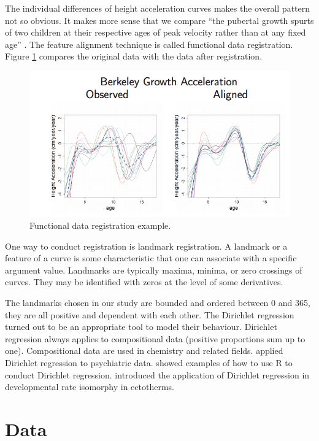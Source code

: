 \documentclass{article}
\begin{document}
The individual differences of height acceleration curves makes the overall pattern not so obvious. It makes more sense that we compare ``the pubertal growth spurts of two children at their respective ages of peak velocity rather than at any fixed age'' \citep{ramsay2006functional}. The feature alignment technique is called functional data registration. Figure \ref{Fig:fdaregi} compares the original data with the data after registration.

\begin{figure}[!ht]
\centering
\includegraphics[width=14cm]{egregistration.png}
\caption{Functional data registration example. \citep{FDAGiles}}
\label{Fig:fdaregi}
\end{figure}

One way to conduct registration is landmark registration. 
A landmark or a feature of a curve is some characteristic that one can associate with a specific argument value. Landmarks are typically maxima, minima, or zero crossings of curves.
They may be identified with zeros at the level of some derivatives.

The landmarks chosen in our study are bounded and ordered between 0 and 365, they are all positive and dependent with each other. The Dirichlet regression \citep{hijazi2009modelling} turned out to be an appropriate tool to model their behaviour. Dirichlet regression always applies to compositional data (positive proportions sum up to one). Compositional data are used in chemistry  and related fields.  \citet{gueorguieva2008dirichlet} applied Dirichlet regression to psychiatric data.  \citet{maier2014dirichletreg} showed examples of how to use R to conduct Dirichlet regression. \citet{boukal2015analyses} introduced the application of Dirichlet regression in developmental rate isomorphy in ectotherms. 

\section{Data}\label{Sec:Data}
\end{document}
